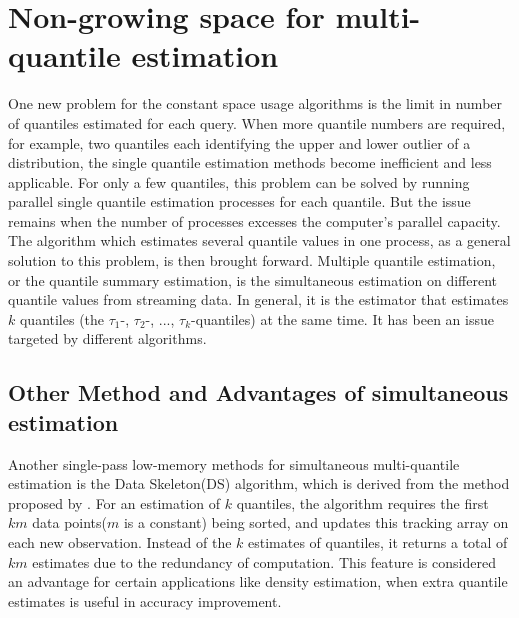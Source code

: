 
\section{Non-growing space for multi-quantile estimation}
\label{multiquantile}
One new problem for the constant space usage algorithms is the limit in number of quantiles estimated for each query.
When more quantile numbers are required, for example, two quantiles each identifying the upper and lower outlier of a distribution, the single quantile estimation methods become inefficient and less applicable.
For only a few quantiles, this problem can be solved by running parallel single quantile estimation processes for each quantile. But the issue remains when the number of processes excesses the computer's parallel capacity.
The algorithm which estimates several quantile values in one process, as a general solution to this problem, is then brought forward.
Multiple quantile estimation, or the quantile summary estimation, is the simultaneous estimation on different quantile values from streaming data. 
In general, it is the estimator that estimates $k$ quantiles (the $\tau_1$-, $\tau_2$-, $...$, $\tau_k$-quantiles) at the same time.
It has been an issue targeted by different algorithms.



\subsection{Other Method and Advantages of simultaneous estimation}

Another single-pass low-memory methods for simultaneous multi-quantile estimation is the Data Skeleton(DS)\cite{mcdermottDataSkeletonsSimultaneous2007} algorithm, which is derived from the method proposed by \citeauthor{liechtySinglepassLowstorageArbitrary} \cite{liechtySinglepassLowstorageArbitrary}. For an estimation of $k$ quantiles, the algorithm requires the first $km$ data points($m$ is a constant) being sorted, and updates this tracking array on each new observation. Instead of the $k$ estimates of quantiles, it returns a total of $km$ estimates due to the redundancy of computation. This feature is considered an advantage for certain applications like density estimation, when extra quantile estimates is useful in accuracy improvement.


